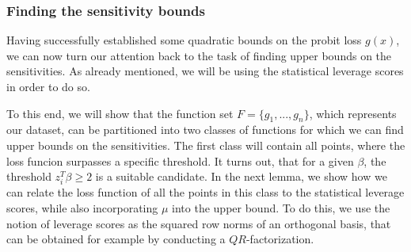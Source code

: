 \subsubsection{Finding the sensitivity bounds}

Having successfully established some quadratic bounds on the
probit loss $g(x)$, we can now turn our attention back to the
task of finding upper bounds on the sensitivities.
As already mentioned, we will be using the statistical leverage scores
in order to do so.

To this end, we will show that the function set $F = \{g_1, ..., g_n\}$,
which represents our dataset, can be partitioned into
two classes of functions for which we can find upper bounds
on the sensitivities.
The first class will contain all points, where the loss funcion
surpasses a specific threshold. It turns out, that
for a given $\beta$, the threshold $z_i^T \beta \geq 2$ is a suitable
candidate. In the next lemma, we show how we can relate the
loss function of all the points in this class to the
statistical leverage scores, while also incorporating $\mu$
into the upper bound. To do this, we use the notion of leverage
scores as the squared row norms of an orthogonal basis,
that can be obtained for example by conducting a $QR$-factorization.

